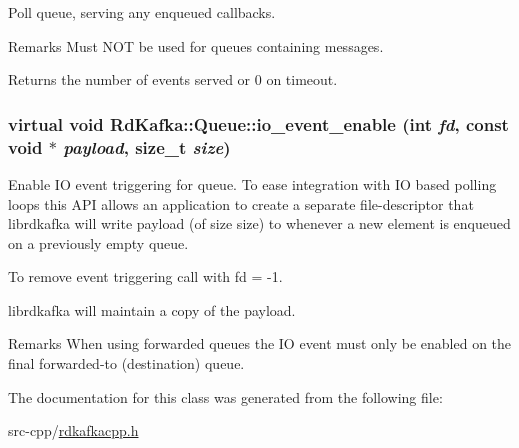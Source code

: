 Poll queue, serving any enqueued callbacks. \begin{DoxyRemark}{Remarks}
Must NOT be used for queues containing messages.
\end{DoxyRemark}
\begin{DoxyReturn}{Returns}
the number of events served or 0 on timeout. 
\end{DoxyReturn}
\hypertarget{classRdKafka_1_1Queue_a91ec180ff3b7f3a97be7b7e30163625c}{
\subsubsection[{io\_\-event\_\-enable}]{\setlength{\rightskip}{0pt plus 5cm}virtual void RdKafka::Queue::io\_\-event\_\-enable (int {\em fd}, \/  const void $\ast$ {\em payload}, \/  size\_\-t {\em size})}}
\label{classRdKafka_1_1Queue_a91ec180ff3b7f3a97be7b7e30163625c}


Enable IO event triggering for queue. To ease integration with IO based polling loops this API allows an application to create a separate file-\/descriptor that librdkafka will write {\ttfamily payload} (of size {\ttfamily size}) to whenever a new element is enqueued on a previously empty queue.

To remove event triggering call with {\ttfamily fd} = -\/1.

librdkafka will maintain a copy of the {\ttfamily payload}.

\begin{DoxyRemark}{Remarks}
When using forwarded queues the IO event must only be enabled on the final forwarded-\/to (destination) queue. 
\end{DoxyRemark}


The documentation for this class was generated from the following file:\begin{DoxyCompactItemize}
\item 
src-\/cpp/\hyperlink{rdkafkacpp_8h}{rdkafkacpp.h}\end{DoxyCompactItemize}
